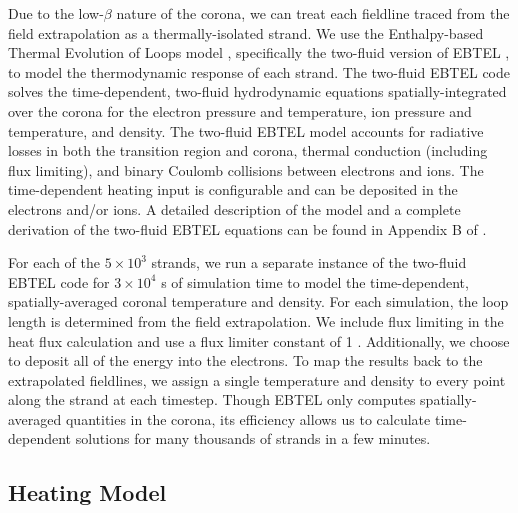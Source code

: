 Due to the low-$\beta$ nature of the corona, we can treat each fieldline traced from the field extrapolation as a thermally-isolated strand. We use the Enthalpy-based Thermal Evolution of Loops model \citep[EBTEL,][]{klimchuk_highly_2008,cargill_enthalpy-based_2012,cargill_enthalpy-based_2012-1}, specifically the two-fluid version of EBTEL \citep{barnes_inference_2016}, to model the thermodynamic response of each strand. The two-fluid EBTEL code solves the time-dependent, two-fluid hydrodynamic equations spatially-integrated over the corona for the electron pressure and temperature, ion pressure and temperature, and density. The two-fluid EBTEL model accounts for radiative losses in both the transition region and corona, thermal conduction (including flux limiting), and binary Coulomb collisions between electrons and ions. The time-dependent heating input is configurable and can be deposited in the electrons and/or ions. A detailed description of the model and a complete derivation of the two-fluid EBTEL equations can be found in Appendix B of \citet{barnes_inference_2016}.

For each of the $5\times10^3$ strands, we run a separate instance of the two-fluid EBTEL code for $3\times10^4$ s of simulation time to model the time-dependent, spatially-averaged coronal temperature and density. For each simulation, the loop length is determined from the field extrapolation. We include flux limiting in the heat flux calculation and use a flux limiter constant of 1 \citep[see Eqs. 21 and 22 of][]{klimchuk_highly_2008}. Additionally, we choose to deposit all of the energy into the electrons. To map the results back to the extrapolated fieldlines, we assign a single temperature and density to every point along the strand at each timestep. Though EBTEL only computes spatially-averaged quantities in the corona, its efficiency allows us to calculate time-dependent solutions for many thousands of strands in a few minutes.

\subsection{Heating Model}\label{heating}


